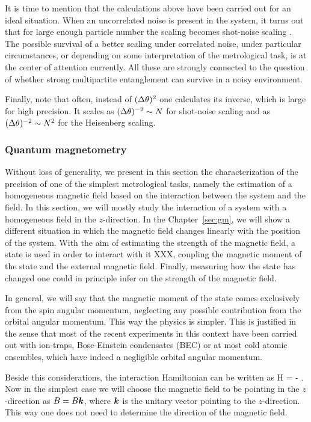 It is time to mention that the calculations above have been carried out for an ideal situation.
When an uncorrelated noise is present in the system, it turns out that for large enough particle number the scaling becomes shot-noise scaling \cite{Demkowicz-Dobrzanski2012}.
The possible survival of a better scaling under correlated noise, under particular circumstances, or depending on some interpretation of the metrological task, is at the center of attention currently.
All these are strongly connected to the question of whether strong multipartite entanglement can survive in a noisy environment.

Finally, note that often, instead of $(\Delta \theta )^2$ one calculates its inverse, which is large for high precision.
It scales as $(\Delta \theta )^{-2}\sim N$ for shot-noise scaling and as $(\Delta \theta )^{-2}\sim N^2$ for the Heisenberg scaling.

\subsubsection{Quantum magnetometry}
\label{sec:bg-quantum-magnetometry}

Without loss of generality, we present in this section the characterization of the precision of one of the simplest metrological tasks, namely the estimation of a homogeneous magnetic field based on the interaction between the system and the field.
In this section, we will mostly study the interaction of a system with a homogeneous field in the $z$-direction.
In the Chapter~\ref{sec:gm}, we will show a different situation in which the magnetic field changes linearly with the position of the system.
With the aim of estimating the strength of the magnetic field, a state is used in order to interact with it XXX, coupling the magnetic moment of the state and the external magnetic field.
Finally, measuring how the state has changed one could in principle infer on the strength of the magnetic field.

In general, we will say that the magnetic moment of the state comes exclusively from the spin angular momentum, neglecting any possible contribution from the orbital angular momentum.
This way the physics is simpler.
This is justified in the sense that most of the recent experiments in this context have been carried out with ion-traps, Bose-Einstein condensates (BEC) or at most cold atomic ensembles, which have indeed a negligible orbital angular momentum.

Beside this considerations, the interaction Hamiltonian can be written as
\be
  H = - \bs{\mu} \cdot {}.
\ee
Now in the simplest case we will choose the magnetic field to be pointing in the $z$-direction as ${B}=B\boldsymbol{k}$, where $\boldsymbol{k}$ is the unitary vector pointing to the $z$-direction.
This way one does not need to determine the direction of the magnetic field.

